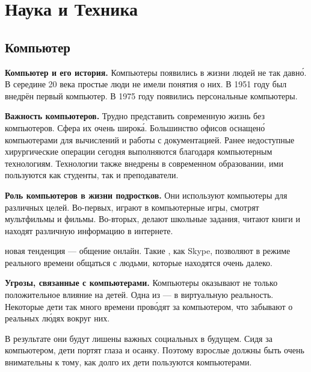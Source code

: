 \chapter{Наука и Техника}


\section{Компьютер}
\textbf{Компьютер и его история.} Компьютеры появились в жизни людей не так давн\'{о}. В середине 20 века простые люди не имели понятия о них. В 1951 году был внедрён первый  компьютер. В 1975 году появились персональные компьютеры.

\textbf{Важность компьютеров.} Трудно представить современную жизнь без компьютеров. Сфера их  очень широк\'{а}.
Большинство офисов оснащен\'{о} компьютерами для вычислений и работы с документацией. Ранее недоступные хирургические операции сегодня выполняются благодаря компьютерным технологиям. Технологии также внедрены в современном образовании, ими пользуются как студенты, так и преподаватели.

\textbf{Роль компьютеров в жизни подростков.}
Они используют компьютеры для различных целей. Во-первых, играют в компьютерные игры, смотрят мультфильмы и фильмы. Во-вторых, делают школьные задания, читают книги и находят различную информацию в интернете.

 новая тенденция --- общение онлайн. Такие , как Skype, позволяют в режиме реального времени общаться с людьми, которые находятся очень далеко.

\textbf{Угрозы, связанные с компьютерами.}
Компьютеры оказывают не только положительное влияние на детей. Одна из  ---  в виртуальную реальность. Некоторые дети так много времени пров\'{о}дят за компьютером, что забывают о реальных л\'{ю}дях вокруг них.

В результате они будут лишены важных социальных  в будущем. Сидя за компьютером, дети портят глаза и осанку. Поэтому взрослые должны быть очень внимательны к тому, как долго их дети пользуются компьютерами.



\clearpage
